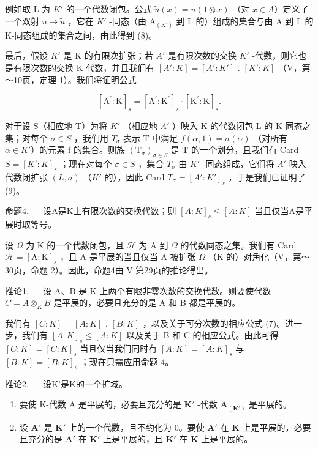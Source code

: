 例如取 L 为 \(K'\) 的一个代数闭包。公式 \(\tilde{u}(x)=u(1\otimes x)\) （对 \(x\in A\)）定义了一个双射 \(u\mapsto\tilde{u}\) ，它在 \(K'\) -同态（由 \(\mathrm{A}_{(\mathrm{K}')}\) 到 L 的）组成的集合与由 A 到 L 的 K-同态组成的集合之间，由此得到 (8)。

最后，假设 \(K'\) 是 K 的有限次扩张；若 \(A'\) 是有限次数的交换 \(K'\) -代数，则它也是有限次数的交换 K-代数，并且我们有 \([A':K] = [A':K']\) . \([K':K]\) （V，第～10页，定理 1）。我们将证明公式

\[
[ \mathrm{A} ^ {\prime}: \mathrm{K} ] _ {s} = [ \mathrm{A} ^ {\prime}: \mathrm{K} ^ {\prime} ] _ {s} \cdot [ \mathrm{K} ^ {\prime}: \mathrm{K} ] _ {s}.\tag{9}
\]

对于设 S（相应地 T）为将 \(K'\) （相应地 \(A'\) ）映入 K 的代数闭包 L 的 K-同态之集；对每个 \(\sigma \in S\) ，我们用 \(T_{\sigma}\) 表示 T 中满足 \(f(\alpha, 1) = \sigma(\alpha)\) （对所有 \(\alpha \in K'\)）的元素 f 的集合。则族 \((\mathrm{T}_{\sigma})_{\sigma \in S}\) 是 T 的一个划分，且我们有 Card \(S = [K': K]_{s}\) ；现在对每个 \(\sigma \in S\) ，集合 \(T_{\sigma}\) 由 \(K'\) -同态组成，它们将 \(A'\) 映入代数闭扩张 \((L, \sigma)\) （\(K'\) 的），因此 Card \(T_{\sigma} = [A': K']_{s}\) ，于是我们已证明了 (9)。

命题4. --- 设A是K上有限次数的交换代数；则 \([A:K]_{s} \leqslant [A:K]\) 当且仅当A是平展时取等号。

设 \(\Omega\) 为 K 的一个代数闭包，且 \(\mathcal{H}\) 为 A 到 \(\Omega\) 的代数同态之集。我们有 Card \(\mathcal{H} = [\mathrm{A}:\mathrm{K}]_s\) ，且 A 是平展的当且仅当 A 被扩张 \(\Omega\) （K 的）对角化（V，第～30页，命题 2）。因此，命题4由 V 第29页的推论得出。

推论1. --- 设 A、B 是 K 上两个有限非零次数的交换代数。则要使代数 \(C = A \otimes_{K} B\) 是平展的，必要且充分的是 A 和 B 都是平展的。

我们有 \([C:K]=[A:K]\) . \([B:K]\) ，以及关于可分次数的相应公式 (7)。进一步，我们有 \([A:K]_{s}\leqslant[A:K]\) 以及关于 B 和 C 的相应公式。由此可得 \([C:K]=[C:K]_{s}\) 当且仅当我们同时有 \([A:K]=[A:K]_{s}\) 与 \([B:K]=[B:K]_{s}\) ；现在只需应用命题 4。

推论2. --- 设K'是K的一个扩域。

\begin{enumerate}
\def\labelenumi{\alph{enumi})}
\item
  要使 K-代数 A 是平展的，必要且充分的是 \(\mathbf{K}'\) -代数 \(\mathbf{A}_{(\mathbf{K}')}\) 是平展的。
\item
  设 \(\mathbf{A}'\) 是 \(\mathbf{K}'\) 上的一个代数，且不约化为 0。要使 \(\mathbf{A}'\) 在 \(\mathbf{K}\) 上是平展的，必要且充分的是 \(\mathbf{A}'\) 在 \(\mathbf{K}'\) 上是平展的，且 \(\mathbf{K}'\) 在 \(\mathbf{K}\) 上是平展的。
\end{enumerate}

